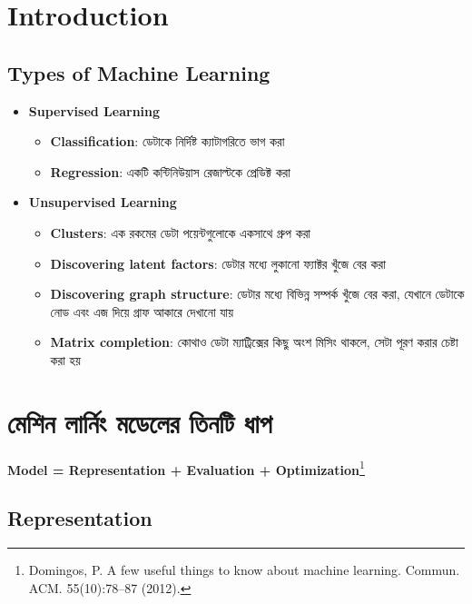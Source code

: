 \documentclass[graybox, envcountchap, twocolumn]{styles/svmult}
\begin{document}
\section{Introduction}

\subsection{Types of Machine Learning}

\begin{itemize}
    \item \textbf{Supervised Learning}
    \begin{itemize}
        \item \textbf{Classification}: {\bengalifont ডেটাকে নির্দিষ্ট ক্যাটাগরিতে ভাগ করা}
        \item \textbf{Regression}: {\bengalifont একটি কন্টিনিউয়াস রেজাল্টকে প্রেডিক্ট করা}
    \end{itemize}
    \item \textbf{Unsupervised Learning}
    \begin{itemize}
        \item \textbf{Clusters}: {\bengalifont এক রকমের ডেটা পয়েন্টগুলোকে একসাথে গ্রুপ করা}
        \item \textbf{Discovering latent factors}: {\bengalifont ডেটার মধ্যে লুকানো ফ্যাক্টর খুঁজে বের করা}
        \item \textbf{Discovering graph structure}: {\bengalifont ডেটার মধ্যে বিভিন্ন সম্পর্ক খুঁজে বের করা, যেখানে ডেটাকে নোড এবং এজ দিয়ে গ্রাফ আকারে দেখানো যায়}
        \item \textbf{Matrix completion}: {\bengalifont কোথাও ডেটা ম্যাট্রিক্সের কিছু অংশ মিসিং থাকলে, সেটা পূরণ করার চেষ্টা করা হয়}
    \end{itemize}
\end{itemize}


\section{{\bengalifont মেশিন লার্নিং মডেলের তিনটি ধাপ}}

\textbf{Model = Representation + Evaluation + Optimization}\footnote{Domingos, P. A few useful things to know about machine learning. Commun. ACM. 55(10):78–87 (2012).}


\subsection{Representation}
\end{document}
